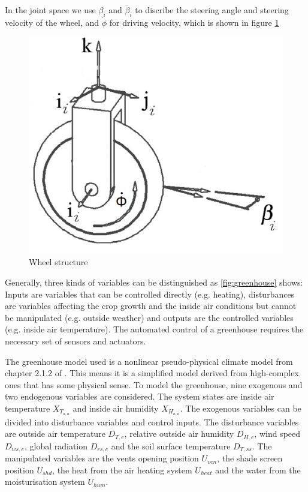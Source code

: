 In the joint space we use $\beta_{i}$ and $\dot{\beta_{i}}$ to discribe the steering angle and steering velocity of the wheel, and $\dot{\phi}$ for driving velocity, which is shown in figure \cref{fig:wheel}

\begin{figure}[t]
\begin{center}
\includegraphics[width=.7\textwidth]{../Figures/wheel.png}
\caption{Wheel structure}
\label{fig:wheel}
\end{center}
\end{figure}

Generally, three kinds of variables can be distinguished as \cref{fig:greenhouse} shows: Inputs are variables that can be controlled directly (e.g. heating), disturbances are variables affecting the crop growth and the inside air conditions but cannot be manipulated (e.g. outside weather) and outputs are the controlled variables (e.g. inside air temperature).
The automated control of a greenhouse requires the necessary set of sensors and actuators.



The greenhouse model used is a nonlinear pseudo-physical climate model from chapter 2.1.2 of \cite{Rodriguez.2015}.
This means it is a simplified model derived from high-complex ones that has some physical sense.
To model the greenhouse, nine exogenous and two endogenous variables are considered.
The system states are inside air temperature $X_{T_{a,a}}$ and inside air humidity $X_{H_{a,a}}$.
The exogenous variables can be divided into disturbance variables and control inputs.
The disturbance variables are outside air temperature $D_{T,e}$, relative outside air humidity $D_{H,e}$, wind speed $D_{ws,e}$, global radiation $D_{rs,e}$ and the soil surface temperature $D_{T,ss}$.
The manipulated variables are the vents opening position $U_{ven}$, the shade screen position $U_{shd}$, the heat from the air heating system $U_{heat}$ and the water from the moisturisation system $U_{hum}$.


